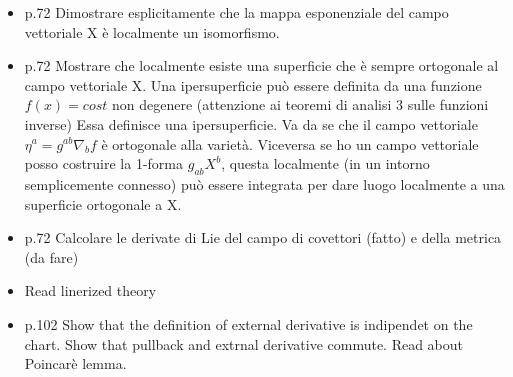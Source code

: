 \documentclass[10pt,a4paper]{article}
\begin{document}
\begin{itemize}
\item p.72 Dimostrare esplicitamente che la mappa esponenziale del campo vettoriale X è localmente un isomorfismo.

\item p.72 Mostrare che localmente esiste una superficie che è sempre ortogonale al campo vettoriale X. Una ipersuperficie può essere definita da una funzione $f(x) = cost$ non degenere (attenzione ai teoremi di analisi 3 sulle funzioni inverse) Essa definisce una ipersuperficie. Va da se che il campo vettoriale $\eta^a = g^{ab} \nabla_{b} f$ è ortogonale alla varietà. Viceversa se ho un campo vettoriale posso costruire la 1-forma $g_{ab} X^{b}$, questa localmente (in un intorno semplicemente connesso) può essere integrata per dare luogo localmente a una superficie ortogonale a X.

\item p.72 Calcolare le derivate di Lie del campo di covettori (fatto) e della metrica (da fare)

\item Read linerized theory

\item p.102 Show that the definition of external derivative is indipendet on the chart. Show that pullback and extrnal derivative commute. Read about Poincarè lemma.
\end{itemize}
\end{document}
